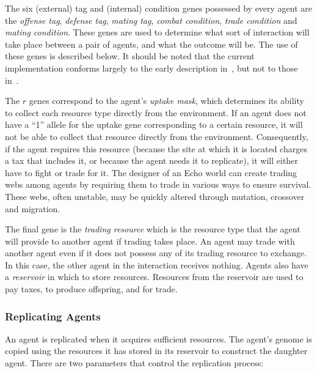 The six (external) tag and (internal) condition genes possessed by
every agent are the {\em offense tag}, {\em defense tag}, {\em mating
tag}, {\em combat condition}, {\em trade condition\/} and {\em mating
condition}.  These genes are used to determine what sort of
interaction will take place between a pair of agents, and what the
outcome will be.  The use of these genes is described below. It should
be noted that the current implementation conforms largely to the early
description in~\cite{Holland92}, but not to those
in~\cite{Holland94,Holland95a}.

The $r$ genes correspond to the agent's {\em uptake mask}, which
determines its ability to collect each resource type directly from the
environment. If an agent does not have a ``1'' allele for the uptake
gene corresponding to a certain resource, it will not be able to
collect that resource directly from the environment.  Consequently, if
the agent requires this resource (because the site at which it is
located charges a tax that includes it, or because the agent needs it
to replicate), it will either have to fight or trade for it. The
designer of an Echo world can create trading webs among agents by
requiring them to trade in various ways to ensure survival.  These
webs, often unstable, may be quickly altered through mutation,
crossover and migration.

The final gene is the {\em trading resource\/} which is the resource
type that the agent will provide to another agent if trading takes
place.  An agent may trade with another agent even if it does not
possess any of its trading resource to exchange. In this case, the
other agent in the interaction receives nothing.  Agents also have a
{\em reservoir\/} in which to store resources.  Resources from the
reservoir are used to pay taxes, to produce offspring, and for trade.


\subsubsection{Replicating Agents}
\label{self-reproduction}

An agent is replicated when it acquires sufficient resources.  The
agent's genome is copied using the resources it has stored in its
reservoir to construct the daughter agent.  There are two
parameters that control the replication process:

